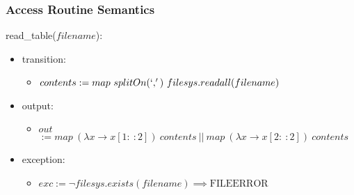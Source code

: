 \documentclass[12pt,fleqn]{article}
\begin{document}
\subsubsection* {Access Routine Semantics}

read\_table($filename$):
\begin{itemize}
\item transition: \begin{itemize}
                        \item[] $contents := map~splitOn(`,')~filesys.readall(filename)$
                        \end{itemize}
\item output: \begin{itemize}
                    \item[] $out$ \tabto{1.5cm} $ := map~(\lambda x \rightarrow x[1:~:2])~contents~||~map~(\lambda x \rightarrow x[2:~:2])~contents$
                    \end{itemize}
\item exception: \begin{itemize}
                        \item[] $exc := \neg filesys.exists(filename) \implies \textrm{FILEERROR}$
                        \end{itemize}
\end{itemize}
\end{document}
